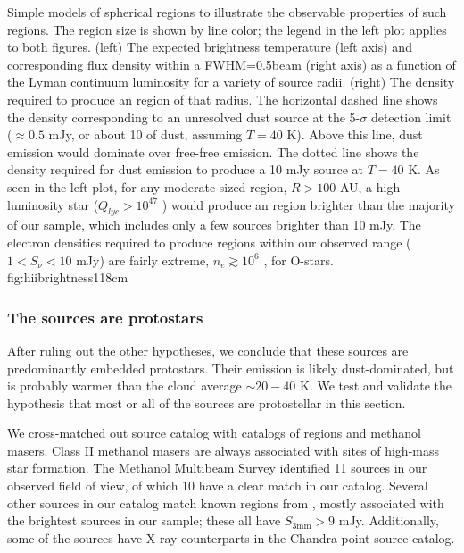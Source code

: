 \documentclass[twocolumn]{aastex61}
\begin{document}
{Simple models of spherical \hii regions to illustrate the observable
properties of such regions.  The \hii region size is shown by line color; the legend
in the left plot applies to both figures.  (left) The expected brightness temperature (left
axis) and corresponding flux density within a FWHM=0.5\arcsec beam (right axis) as a
function of the Lyman continuum luminosity for a variety of source radii.
(right) The density required to produce an \hii region of that radius.  The
horizontal dashed line shows the density corresponding to an unresolved dust
source at the 5-$\sigma$ detection limit ($\approx0.5$ mJy, or about 10 \msun
of dust,
assuming $T=40$ K).  Above this line, dust emission would dominate over
free-free emission.  The dotted line shows the density required for dust
emission to produce a 10 mJy source at $T=40$ K.  
As seen in the left plot, for any moderate-sized \hii region, $R>100$ AU, a high-luminosity
star ($Q_{lyc} > 10^{47}$ \pers) would produce an \hii region brighter than the
majority of our sample, which includes only a few sources brighter than 10 mJy.
The electron densities required to produce \hii regions within our observed range
($1<S_\nu<10$ mJy) are fairly extreme, $n_e\gtrsim10^6$ \percc, for O-stars.}
{fig:hiibrightness}{1}{18cm}


\subsubsection{The sources are protostars}
\label{sec:theyareprotostars}
After ruling out the other hypotheses, we conclude that these sources are
predominantly embedded protostars.  Their emission is likely dust-dominated,
but is probably warmer than the cloud average $\sim20-40$ K.
We test and validate the hypothesis that most or all of the sources
are protostellar in this section.

We cross-matched out source catalog with catalogs of \hii regions and 
methanol masers.  Class II methanol masers are always associated
with sites of high-mass star formation.
The \citet{Caswell2010a} Methanol Multibeam Survey identified 11 sources in our
observed field of view, of which 10 have a clear match in our catalog.
Several other sources in our catalog match known \hii regions from
\citet{Gaume1995a}, mostly associated with the brightest sources in our sample;
these all have $S_{3 \textrm{mm}} > 9$ mJy.  Additionally, some of the
sources have X-ray counterparts in the \citet{Muno2009a} Chandra point source
catalog.
\end{document}
